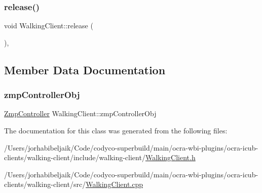 \subsubsection{\texorpdfstring{release()}{release()}}
{\footnotesize\ttfamily void Walking\+Client\+::release (\begin{DoxyParamCaption}{ }\end{DoxyParamCaption})\hspace{0.3cm}{\ttfamily [protected]}, {\ttfamily [virtual]}}



\subsection{Member Data Documentation}
\hypertarget{classWalkingClient_a9f236d1c08bf0d517faa29bf907fdc85}{}\label{classWalkingClient_a9f236d1c08bf0d517faa29bf907fdc85} 
\subsubsection{\texorpdfstring{zmp\+Controller\+Obj}{zmpControllerObj}}
{\footnotesize\ttfamily \hyperlink{classZmpController}{Zmp\+Controller} Walking\+Client\+::zmp\+Controller\+Obj\hspace{0.3cm}{\ttfamily [private]}}



The documentation for this class was generated from the following files\+:\begin{DoxyCompactItemize}
\item 
/\+Users/jorhabibeljaik/\+Code/codyco-\/superbuild/main/ocra-\/wbi-\/plugins/ocra-\/icub-\/clients/walking-\/client/include/walking-\/client/\hyperlink{WalkingClient_8h}{Walking\+Client.\+h}\item 
/\+Users/jorhabibeljaik/\+Code/codyco-\/superbuild/main/ocra-\/wbi-\/plugins/ocra-\/icub-\/clients/walking-\/client/src/\hyperlink{WalkingClient_8cpp}{Walking\+Client.\+cpp}\end{DoxyCompactItemize}

